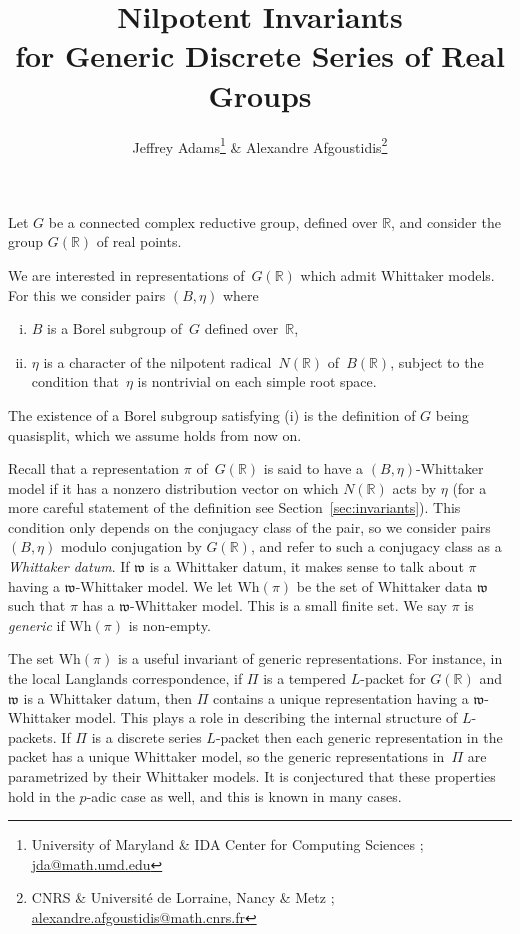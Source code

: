 \documentclass[10pt,leqno]{article}
\numberwithin{equation}{section}
\newcommand{\R}{\mathbb R}
\newcommand{\w}{\mathfrak w}
\newcommand{\Wh}{\mathrm{Wh}}
\begin{document}
\title{Nilpotent Invariants \\ for Generic Discrete Series of Real Groups}
\author{Jeffrey Adams\footnote{University of Maryland \& IDA Center for Computing Sciences ; \url{jda@math.umd.edu}} {} \& Alexandre Afgoustidis\footnote{CNRS \& Université de Lorraine, Nancy \& Metz ; \url{alexandre.afgoustidis@math.cnrs.fr}}}

\maketitle

Let $G$ be a connected complex reductive group, defined over $\R$, and consider the group $G(\R)$ of real points. 

We are interested in representations of~$G(\R)$ which admit Whittaker models. For this we consider pairs $(B,\eta)$ where 
\begin{enumerate}[(i)]
\item $B$ is a Borel subgroup of~$G$ defined over~$\R$,
\item $\eta$ is a character of the nilpotent radical~$N(\R)$ of~$B(\R)$, subject to the condition that~$\eta$ is nontrivial on each simple root space.
\end{enumerate}
The existence of a Borel subgroup satisfying (i) is the definition of $G$ being quasisplit, which we assume holds from now on.

Recall that a representation $\pi$ of~$G(\R)$ is said to {have a $(B,\eta)$-Whittaker model} if it has a nonzero distribution vector on which $N(\R)$ acts by $\eta$ (for a more careful statement of the definition see Section~\ref{sec:invariants}).
This condition only depends on the conjugacy class of the pair, 
so we  consider pairs $(B,\eta)$ modulo conjugation by $G(\R)$, and refer to such a conjugacy class
as a {\it Whittaker datum}.
If $\w$ is a Whittaker datum, it makes sense to talk about $\pi$ having a $\w$-Whittaker model. We let $\Wh(\pi)$  be the set of
Whittaker data $\w$ such that $\pi$ has a $\w$-Whittaker model. This is a small finite set.
We say $\pi$ is {\it generic} if $\Wh(\pi)$ is non-empty.

The set $\Wh(\pi)$ is
a useful invariant of generic representations.
For instance, in the local Langlands correspondence, if $\Pi$ is a tempered $L$-packet for $G(\R)$ and $\w$ is a Whittaker datum, then $\Pi$ contains a unique representation
having a $\w$-Whittaker model. This plays a role in describing the internal structure of $L$-packets.
If $\Pi$ is a discrete series $L$-packet then each generic representation in the packet has a unique
Whittaker model, so the generic representations in~$\Pi$ are parametrized by their Whittaker models.
It is conjectured that these properties hold in the $p$-adic case as well, and this is known in many cases.
\end{document}
